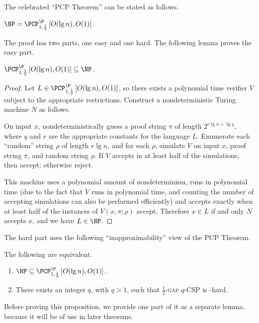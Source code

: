 \documentclass[]{article}
\newcommand{\PCPcs}[5]{\PCP^{#1}_{#2, #3}\left[#4, #5\right]}
\begin{document}
The celebrated ``PCP Theorem'' can be stated as follows.
\begin{theorem}
  $\NP = \PCPcs{\P}{1}{\frac{1}{2}}{O(\lg n)}{O(1)}$.
\end{theorem}
The proof has two parts, one easy and one hard.
The following lemma proves the easy part.
\begin{lemma}\label{lem:pcpinnp}
  $\PCPcs{\P}{1}{\frac{1}{2}}{O(\lg n)}{O(1)} \subseteq \NP$.
\end{lemma}
\begin{proof}
  Let $L \in \PCPcs{\P}{1}{\frac{1}{2}}{O(\lg n)}{O(1)}$, so there exists a polynomial time \PCP{} verifier $V$ subject to the appropriate restrictions.
  Construct a nondeterministic Turing machine $N$ as follows.

  On input $x$, nondeterministically guess a proof string $\pi$ of length $2^{r \lg n + \lg q}$, where $q$ and $r$ are the appropriate constants for the language $L$.
  Enumerate each ``random'' string $\rho$ of length $r \lg  n$, and for each $\rho$, simulate $V$ on input $x$, proof string $\pi$, and random string $\rho$.
  If $V$ accepts in at least half of the simulations, then accept; otherwise reject.

  This machine uses a polynomial amount of nondeterminism, runs in polynomial time (due to the fact that $V$ runs in polynomial time, and counting the number of accepting simulations can also be performed efficiently) and accepts exactly when at least half of the instances of $V(x, \pi; \rho)$ accept.
  Therefore $x \in L$ if and only $N$ accepts $x$, and we have $L \in \NP$.  
\end{proof}

The hard part uses the following ``inapproximability'' view of the PCP Theorem.
\begin{proposition}\label{prop:equivalence}
  The following are equivalent.
  \begin{enumerate}
  \item $\NP \subseteq \PCPcs{\P}{1}{\frac{1}{2}}{O(\lg n)}{O(1)}$.
  \item There exists an integer $q$, with $q > 1$, such that \textsc{$\frac{1}{2}$-gap $q$-CSP} is \NP-hard.
  \end{enumerate}
\end{proposition}

Before proving this proposition, we provide one part of it as a separate lemma, because it will be of use in later theorems.
\end{document}
